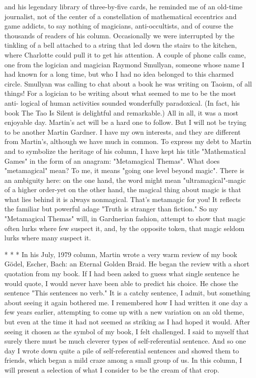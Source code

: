 and his legendary library of three-by-five cards, he reminded me of an old-time
journalist, not of the center of a constellation of mathematical eccentrics and game
addicts, to say nothing of magicians, anti-occultists, and of course the thousands of
readers of his column.
         Occasionally we were interrupted by the tinkling of a bell attached to a string that
led down the stairs to the kitchen, where Charlotte could pull it to get his attention. A
couple of phone calls came, one from the logician and magician Raymond Smullyan,
someone whose name I had known for a long time, but who I had no idea belonged to
this charmed circle. Smullyan was calling to chat about a book he was writing on Taoism,
of all things! For a logician to be writing about what seemed to me to be the most anti-
logical of human activities sounded wonderfully paradoxical. (In fact, his book The Tao
Is Silent is delightful and remarkable.) All in all, it was a most enjoyable day.
         Martin's act will be a hard one to follow. But I will not be trying to be another
Martin Gardner. I have my own interests, and they are different from Martin's, although
we have much in common. To express my debt to Martin and to symbolize the heritage
of his column, I have kept his title "Mathematical Games" in the form of an anagram:
"Metamagical Themas".
         What does "metamagical" mean? To me, it means "going one level beyond
magic". There is an ambiguity here: on the one hand, the word might mean
"ultramagical"-magic of a higher order-yet on the other hand, the magical thing about
magic is that what lies behind it is always nonmagical. That's metamagic for you! It
reflects the familiar but powerful adage "Truth is stranger than fiction." So my
"Metamagical Themas" will, in Gardnerian fashion, attempt to show that magic often
lurks where few suspect it, and, by the opposite token, that magic seldom lurks where
many suspect it.

                                        *     *    *
        In his July, 1979 column, Martin wrote a very warm review of my book Gödel,
Escher, Bach: an Eternal Golden Braid. He began the review with a short quotation from
my book. If I had been asked to guess what single sentence he would quote, I would
never have been able to predict his choice. He chose the sentence "This sentences no
verb." It is a catchy sentence, I admit, but something about seeing it again bothered me. I
remembered how I had written it one day a few years earlier, attempting to come up with
a new variation on an old theme, but even at the time it had not seemed as striking as I
had hoped it would. After seeing it chosen as the symbol of my book, I felt challenged. I
said to myself that surely there must be much cleverer types of self-referential sentence.
And so one day I wrote down quite a pile of self-referential sentences and showed them
to friends, which began a mild craze among a small group of us. In this column, I will
present a selection of what I consider to be the cream of that crop.




